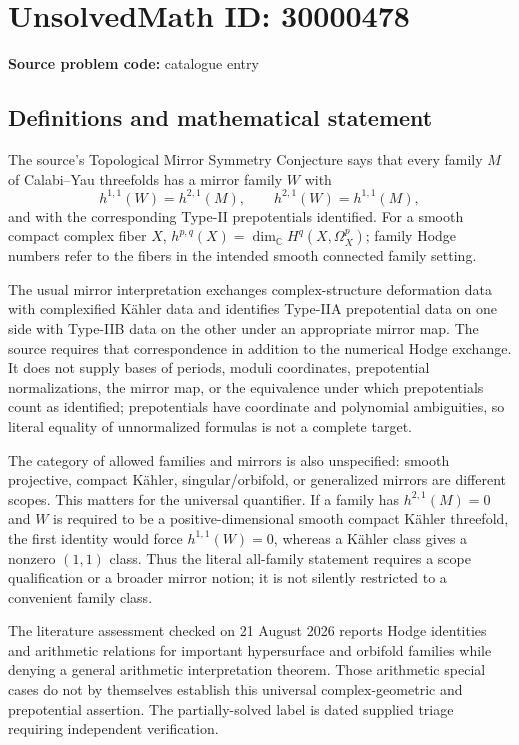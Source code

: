 \documentclass[11pt]{article}
\newcommand{\C}{\mathbb{C}}
\begin{document}
\section*{UnsolvedMath ID: 30000478}
\textbf{Source problem code:} catalogue entry
\subsection{Definitions and mathematical statement}
The source's Topological Mirror Symmetry Conjecture says that every family $M$ of Calabi--Yau threefolds has a mirror family $W$ with
\[
 h^{1,1}(W)=h^{2,1}(M),\qquad
 h^{2,1}(W)=h^{1,1}(M),
\]
and with the corresponding Type-II prepotentials identified. For a smooth compact complex fiber $X$, $h^{p,q}(X)=\dim_\C H^q(X,\Omega_X^p)$; family Hodge numbers refer to the fibers in the intended smooth connected family setting.

The usual mirror interpretation exchanges complex-structure deformation data with complexified K\"ahler data and identifies Type-IIA prepotential data on one side with Type-IIB data on the other under an appropriate mirror map. The source requires that correspondence in addition to the numerical Hodge exchange. It does not supply bases of periods, moduli coordinates, prepotential normalizations, the mirror map, or the equivalence under which prepotentials count as identified; prepotentials have coordinate and polynomial ambiguities, so literal equality of unnormalized formulas is not a complete target.

The category of allowed families and mirrors is also unspecified: smooth projective, compact K\"ahler, singular/orbifold, or generalized mirrors are different scopes. This matters for the universal quantifier. If a family has $h^{2,1}(M)=0$ and $W$ is required to be a positive-dimensional smooth compact K\"ahler threefold, the first identity would force $h^{1,1}(W)=0$, whereas a K\"ahler class gives a nonzero $(1,1)$ class. Thus the literal all-family statement requires a scope qualification or a broader mirror notion; it is not silently restricted to a convenient family class.

The literature assessment checked on 21 August 2026 reports Hodge identities and arithmetic relations for important hypersurface and orbifold families while denying a general arithmetic interpretation theorem. Those arithmetic special cases do not by themselves establish this universal complex-geometric and prepotential assertion. The partially-solved label is dated supplied triage requiring independent verification.
\end{document}
